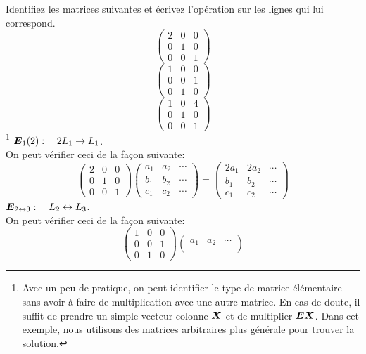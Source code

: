 \begin{exemple}
Identifiez les matrices suivantes et écrivez l'opération sur les lignes qui lui correspond.
\[
\begin{pmatrix}
2 & 0 & 0 \\
0 & 1 & 0\\
0 & 0 & 1
\end{pmatrix}
\]
\[
\begin{pmatrix}
1 & 0 & 0 \\
0 & 0 & 1 \\
0 & 1 & 0
\end{pmatrix}
\]
\[
\begin{pmatrix}
1 & 0 & 4 \\
0 & 1 & 0\\
0 & 0 & 1
\end{pmatrix}
\]
\solution\footnote{
Avec un peu de pratique, on peut identifier le type de matrice élémentaire sans avoir
à faire de multiplication avec une autre matrice.  En cas de doute, il suffit de prendre
un simple vecteur colonne $\boldsymbol{X}$ et de multiplier $\boldsymbol{E}\boldsymbol{X}$. Dans cet exemple, nous
utilisons des matrices arbitraires plus générale pour trouver la solution.}
 $\boldsymbol{E}_1(2): \quad 2 L_1\rightarrow L_1$.\\
  On peut vérifier ceci de la façon suivante:
\[
\begin{pmatrix}
2 & 0 & 0 \\
0 & 1 & 0 \\
0 & 0 & 1
\end{pmatrix}
\begin{pmatrix}
a_1 & a_2 & \cdots \\
b_1 & b_2 & \cdots \\
c_1 & c_2 & \cdots
\end{pmatrix} = 
\begin{pmatrix}
2a_1 & 2a_2 & \cdots \\
b_1 & b_2 & \cdots \\
c_1 & c_2 & \cdots
\end{pmatrix}
\]
 $\boldsymbol{E}_{2\leftrightarrow 3}: \quad L_2 \leftrightarrow L_3$. \\
On peut vérifier ceci de la façon suivante:
\[
\begin{pmatrix}
1 & 0 & 0 \\
0 & 0 & 1 \\
0 & 1 & 0
\end{pmatrix}
\begin{pmatrix}
a_1 & a_2 & \cdots \\

\end{pmatrix}\]
\end{exemple}
